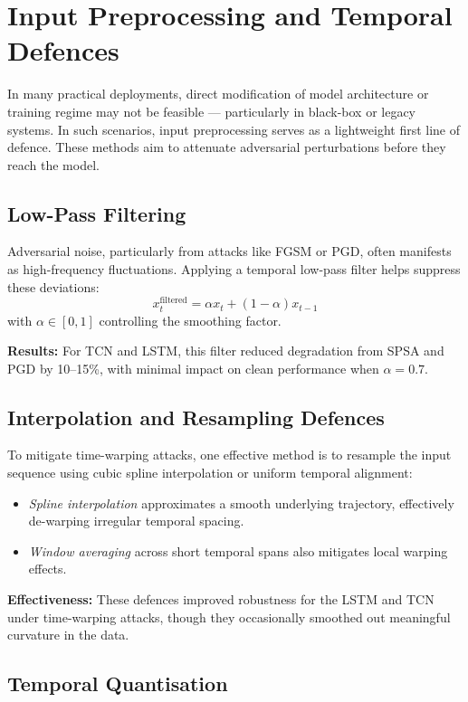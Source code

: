 \section{Input Preprocessing and Temporal Defences}

In many practical deployments, direct modification of model architecture or training regime may not be feasible — particularly in black-box or legacy systems. In such scenarios, input preprocessing serves as a lightweight first line of defence. These methods aim to attenuate adversarial perturbations before they reach the model.

\subsection{Low-Pass Filtering}

Adversarial noise, particularly from attacks like FGSM or PGD, often manifests as high-frequency fluctuations. Applying a temporal low-pass filter helps suppress these deviations:
\[
x_t^{\text{filtered}} = \alpha x_t + (1 - \alpha) x_{t-1}
\]
with $\alpha \in [0, 1]$ controlling the smoothing factor.

\textbf{Results:} For TCN and LSTM, this filter reduced degradation from SPSA and PGD by 10–15\%, with minimal impact on clean performance when $\alpha = 0.7$.

\subsection{Interpolation and Resampling Defences}

To mitigate time-warping attacks, one effective method is to resample the input sequence using cubic spline interpolation or uniform temporal alignment:
\begin{itemize}
    \item \textit{Spline interpolation} approximates a smooth underlying trajectory, effectively de-warping irregular temporal spacing.
    \item \textit{Window averaging} across short temporal spans also mitigates local warping effects.
\end{itemize}

\textbf{Effectiveness:} These defences improved robustness for the LSTM and TCN under time-warping attacks, though they occasionally smoothed out meaningful curvature in the data.

\subsection{Temporal Quantisation}

